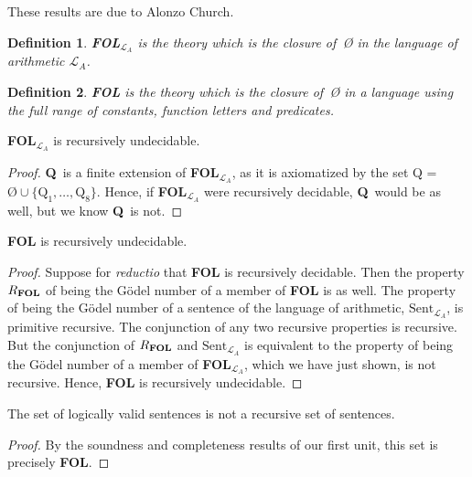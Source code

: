 \documentclass[12pt]{report}
\theoremstyle{nonumberplain}
\newtheorem{definition}{Definition}
\newtheorem{proof}{Proof}
\newcommand{\Q}{\textbf{\textup{Q}}}
\begin{document}
\noindent These results are due to Alonzo Church.

\begin{definition} \textbf{\textup{FOL}}$_{\mathcal{L}_A}$ is the theory which is the closure of \,Ø in the language of arithmetic $\mathcal{L}_A$.
\end{definition}

\begin{definition} \textbf{\textup{FOL}} is the theory which is the closure of \,Ø in a language using the full range of constants, function letters and predicates.
\end{definition}

\begin{mt}
\textbf{\textup{FOL}}$_{\mathcal{L}_A}$ is recursively undecidable.
\end{mt}
\begin{proof}
\Q\ is a finite extension of \textbf{\textup{FOL}}$_{\mathcal{L}_A}$, as it is axiomatized by the set Q = $Ø ∪ \{\mathrm{Q}_1, \dotsc, \mathrm{Q}_8\}$. Hence, if \textbf{\textup{FOL}}$_{\mathcal{L}_A}$ were recursively decidable, \Q\ would be as well, but we know \Q\ is not.
\end{proof}

\begin{coro}
\textbf{\textup{FOL}} is recursively undecidable.
\end{coro}
\begin{proof}
Suppose for \emph{reductio} that \textbf{\textup{FOL}} is recursively decidable. Then the property $R_{\textbf{\textup{FOL}}}$ of being the Gödel number of a member of \textbf{\textup{FOL}} is as well. The property of being the Gödel number of a sentence of the language of arithmetic, $\mathrm{Sent}_{\mathcal{L}_A}$, is primitive recursive. The conjunction of any two recursive properties is recursive. But the conjunction of  $R_{\textbf{\textup{FOL}}}$ and $\mathrm{Sent}_{\mathcal{L}_A}$ is equivalent to the property of being the Gödel number of a member of \textbf{\textup{FOL}}$_{\mathcal{L}_A}$, which we have just shown, is not recursive. Hence, \textbf{\textup{FOL}} is recursively undecidable.
\end{proof}

\begin{coro}
The set of logically valid sentences is not a recursive set of sentences.
\end{coro}

\begin{proof}
By the soundness and completeness results of our first unit, this set is precisely \textbf{\textup{FOL}}.
\end{proof}
\end{document}
